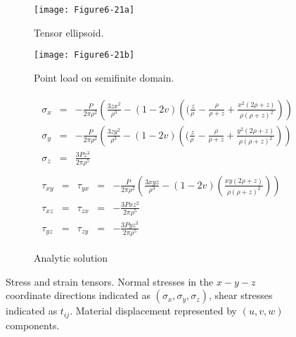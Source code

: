 \begin{figure}[htb]
	\begin{subfigure}[h]{0.48\linewidth}
		\texttt{[image: Figure6-21a]}
		\caption{Tensor ellipsoid.}
		\label{fig:Figure6-21a}
	\end{subfigure}
	\hfill
	\begin{subfigure}[h]{0.48\linewidth}
		\texttt{[image: Figure6-21b]}
		\caption{Point load on semifinite domain.}
		\label{fig:Figure6-21b}
	\end{subfigure}
	\hfill
	\begin{subfigure}[h]{0.96\linewidth}
		\Large
		\begin{equation*}
		\begin{array}{l}
				\begin{array}{lll}
				\sigma{_x} & = &  -\frac{P}{2 \pi \rho ^2}\left(\frac{3zx^2}{\rho ^3} -(1-2v)\left((\frac{z}{\rho\
				} - \frac{\rho}{\rho+z}+\frac{x ^2 (2 \rho + z)}{\rho ( \rho + z) ^2} \right) \right)\\
				\sigma{_y}  & = & -\frac{P}{2 \pi \rho ^2}\left(\frac{3zy^2}{\rho ^3} -(1-2v)\left((\frac{z}{\rho\
				} - \frac{\rho}{\rho+z}+\frac{y ^2 (2 \rho + z)}{\rho ( \rho + z) ^2} \right) \right)  \\
			    \sigma{_z}  & = & \frac{3Pz^3}{2\pi\rho^5}
				\end{array} \\
				\begin{array}{lllll}
				\tau_{xy} &=& \tau_{yx} &=& -\frac{P}{2 \pi \rho ^2}\left( \frac{3xyz}{\rho ^3} - (1-2v)\left(\frac{xy(2 \rho + z)}{\rho ( \rho + z) ^2}\right)\right) \\
				\tau_{xz}&=&\tau_{zx} &=& -\frac{3Pxz^2}{2 \pi \rho ^5}\\
				\tau_{yz}&=&\tau_{zy} &=& -\frac{3Pyz^2}{2 \pi \rho ^5}
				\end{array}
		\end{array}
	\end{equation*}
		\caption{Analytic solution}\label{fig:Figure6-21c}
	\end{subfigure}
	\caption{Stress and strain tensors. Normal stresses in the $x-y-z$ coordinate directions indicated as $(\sigma_x, \sigma_y, \sigma_z)$, shear stresses indicated as $t_{ij}$. Material displacement represented by $(u, v, w)$ components.}\label{fig:Figure6-21}
\end{figure}

